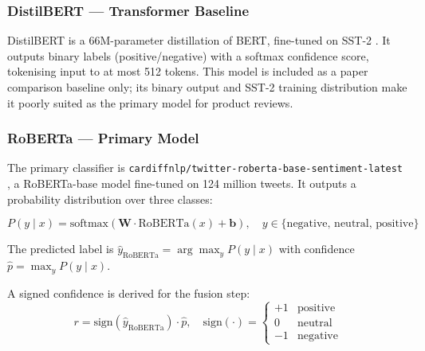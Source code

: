 \subsubsection{DistilBERT — Transformer Baseline}
\begin{justify}
DistilBERT \cite{sanh2019distilbert} is a 66M-parameter distillation of BERT, fine-tuned on SST-2 \cite{socher2013recursive}. It outputs binary labels (positive/negative) with a softmax confidence score, tokenising input to at most 512 tokens. This model is included as a paper comparison baseline only; its binary output and SST-2 training distribution make it poorly suited as the primary model for product reviews.
\end{justify}

\subsubsection{RoBERTa — Primary Model}
\begin{justify}
The primary classifier is \texttt{cardiffnlp/twitter-roberta-base-\allowbreak{}sentiment-latest} \cite{barbieri2020tweeteval}, a RoBERTa-base \cite{liu2019roberta} model fine-tuned on 124 million tweets. It outputs a probability distribution over three classes:

\begin{equation}
    P(y \mid x) = \text{softmax}(\mathbf{W} \cdot \text{RoBERTa}(x) + \mathbf{b}), \quad y \in \{\text{negative, neutral, positive}\}
\end{equation}

The predicted label is $\hat{y}_{\text{RoBERTa}} = \arg\max_{y} P(y \mid x)$ with confidence $\hat{p} = \max_{y} P(y \mid x)$.

A signed confidence is derived for the fusion step:
\begin{equation}
    r = \text{sign}(\hat{y}_{\text{RoBERTa}}) \cdot \hat{p}, \quad \text{sign}(\cdot) = \begin{cases} +1 & \text{positive} \\ 0 & \text{neutral} \\ -1 & \text{negative} \end{cases}
\end{equation}
\end{justify}

